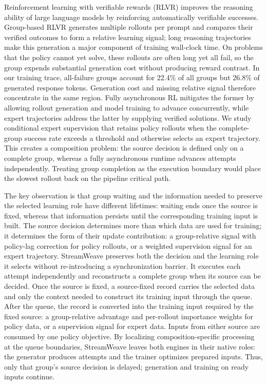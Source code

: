 \documentclass[letterpaper]{article}
\begin{document}
Reinforcement learning with verifiable rewards (RLVR) improves the reasoning ability of large language models by reinforcing automatically verifiable successes.
Group-based RLVR generates multiple rollouts per prompt and compares their verified outcomes to form a relative learning signal; long reasoning trajectories make this generation a major component of training wall-clock time.
On problems that the policy cannot yet solve, these rollouts are often long yet all fail, so the group expends substantial generation cost without producing reward contrast.
In our training trace, all-failure groups account for 22.4\% of all groups but 26.8\% of generated response tokens.
Generation cost and missing relative signal therefore concentrate in the same region.
Fully asynchronous RL mitigates the former by allowing rollout generation and model training to advance concurrently, while expert trajectories address the latter by supplying verified solutions.
We study conditional expert supervision that retains policy rollouts when the complete-group success rate exceeds a threshold and otherwise selects an expert trajectory.
This creates a composition problem: the source decision is defined only on a complete group, whereas a fully asynchronous runtime advances attempts independently.
Treating group completion as the execution boundary would place the slowest rollout back on the pipeline critical path.

The key observation is that group waiting and the information needed to preserve the selected learning role have different lifetimes: waiting ends once the source is fixed, whereas that information persists until the corresponding training input is built.
The source decision determines more than which data are used for training; it determines the form of their update contribution: a group-relative signal with policy-lag correction for policy rollouts, or a weighted supervision signal for an expert trajectory.
StreamWeave preserves both the decision and the learning role it selects without re-introducing a synchronization barrier.
It executes each attempt independently and reconstructs a complete group when its source can be decided.
Once the source is fixed, a source-fixed record carries the selected data and only the context needed to construct its training input through the queue.
After the queue, the record is converted into the training input required by the fixed source: a group-relative advantage and per-rollout importance weights for policy data, or a supervision signal for expert data.
Inputs from either source are consumed by one policy objective.
By localizing composition-specific processing at the queue boundaries, StreamWeave leaves both engines in their native roles: the generator produces attempts and the trainer optimizes prepared inputs.
Thus, only that group's source decision is delayed; generation and training on ready inputs continue.
\end{document}
